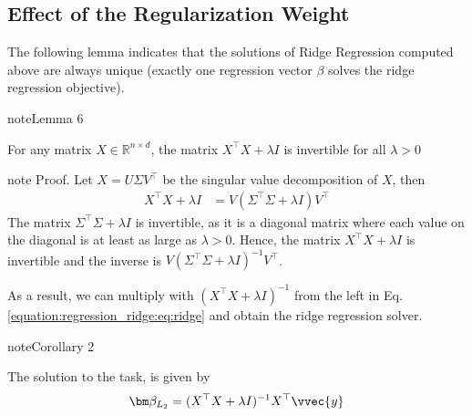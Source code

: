\documentclass[letterpaper,10pt,english]{jupyterBook}
\begin{document}
\subsection{Effect of the Regularization Weight}
\label{\detokenize{regression_ridge:effect-of-the-regularization-weight}}
\sphinxAtStartPar
The following lemma indicates that the solutions of Ridge Regression computed above are always unique (exactly one regression vector \(\beta\) solves the ridge regression objective).
\label{regression_ridge:lemma-0}
\begin{sphinxadmonition}{note}{Lemma 6}



\sphinxAtStartPar
For any matrix \(X\in\mathbb{R}^{n\times d}\), the matrix \(X^\top X+\lambda I\) is invertible for all \(\lambda>0\)
\end{sphinxadmonition}

\begin{sphinxadmonition}{note}
\sphinxAtStartPar
Proof. Let \(X=U\Sigma V^\top\) be the singular value decomposition of \(X\), then
\label{equation:regression_ridge:37250d9d-db0c-4363-8f74-985514b1b394}\begin{align}
    X^\top X+\lambda I 
    &= V(\Sigma^\top\Sigma +\lambda I )V^\top
\end{align}
\sphinxAtStartPar
The matrix \(\Sigma^\top\Sigma +\lambda I\) is invertible, as it is a diagonal matrix where each value on the diagonal is at least as large as \(\lambda>0\). Hence, the matrix \(X^\top X+\lambda I\) is invertible and the inverse is \(V(\Sigma^\top\Sigma +\lambda I )^{-1}V^\top\).
\end{sphinxadmonition}

\sphinxAtStartPar
As a result, we can multiply with \((X^\top X+\lambda I)^{-1}\) from the left in Eq. \eqref{equation:regression_ridge:eq:ridge} and obtain the ridge regression solver.
\label{regression_ridge:corollary-1}
\begin{sphinxadmonition}{note}{Corollary 2}



\sphinxAtStartPar
The solution to the {\hyperref[\detokenize{regression_ridge:ridge-task}]{}} task, is given by
\begin{equation*}
\begin{split}\bm\beta_{L_2} = (X^\top X+\lambda I)^{-1}X^\top \vvec{y}\end{split}
\end{equation*}
\end{sphinxadmonition}
\end{document}
